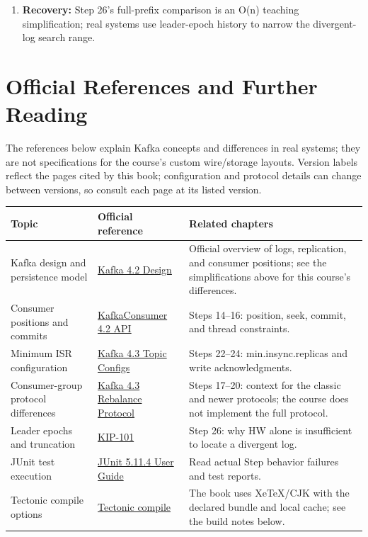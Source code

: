 \begin{enumerate}
\item \textbf{Recovery:} Step 26's full-prefix comparison is an O(n) teaching simplification; real systems use leader-epoch history to narrow the divergent-log search range.
\end{enumerate}

\section{Official References and Further Reading}
The references below explain Kafka concepts and differences in real systems; they are not specifications for the course's custom wire/storage layouts. Version labels reflect the pages cited by this book; configuration and protocol details can change between versions, so consult each page at its listed version.
\begin{longtable}{p{}p{}p{}}
\toprule
Topic & Official reference & Related chapters \\
\midrule
\endhead
Kafka design and persistence model & \href{https://kafka.apache.org/42/design/design/}{Kafka 4.2 Design} & Official overview of logs, replication, and consumer positions; see the simplifications above for this course's differences.\\
Consumer positions and commits & \href{https://kafka.apache.org/42/javadoc/org/apache/kafka/clients/consumer/KafkaConsumer.html}{KafkaConsumer 4.2 API} & Steps 14–16: position, seek, commit, and thread constraints.\\
Minimum ISR configuration & \href{https://kafka.apache.org/43/configuration/topic-configs/}{Kafka 4.3 Topic Configs} & Steps 22–24: min.insync.replicas and write acknowledgments.\\
Consumer-group protocol differences & \href{https://kafka.apache.org/43/operations/consumer-rebalance-protocol/}{Kafka 4.3 Rebalance Protocol} & Steps 17–20: context for the classic and newer protocols; the course does not implement the full protocol.\\
Leader epochs and truncation & \href{https://cwiki.apache.org/confluence/display/KAFKA/KIP-101+-+Alter+Replication+Protocol+to+use+Leader+Epoch+rather+than+High+Watermark+for+Truncation}{KIP-101} & Step 26: why HW alone is insufficient to locate a divergent log.\\
JUnit test execution & \href{https://docs.junit.org/5.11.4/user-guide/}{JUnit 5.11.4 User Guide} & Read actual Step behavior failures and test reports.\\
Tectonic compile options & \href{https://tectonic-typesetting.github.io/book/latest/v2cli/compile.html}{Tectonic compile} & The book uses XeTeX/CJK with the declared bundle and local cache; see the build notes below.\\
\bottomrule
\end{longtable}

